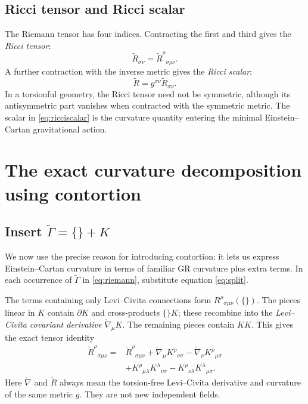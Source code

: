 \documentclass[11pt,a4paper]{article}
\newcommand{\LC}{\mathring{\nabla}}
\newcommand{\RR}{\mathring{R}}
\begin{document}
\subsection{Ricci tensor and Ricci scalar}
The Riemann tensor has four indices. Contracting the first and third gives the \emph{Ricci tensor}:
\begin{equation}\label{eq:ricci}
\boxed{\widetilde R_{\sigma\nu}=\widetilde R^\rho{}_{\sigma\rho\nu}.}
\end{equation}
A further contraction with the inverse metric gives the \emph{Ricci scalar}:
\begin{equation}\label{eq:ricciscalar}
\boxed{\widetilde R=g^{\sigma\nu}\widetilde R_{\sigma\nu}.}
\end{equation}
In a torsionful geometry, the Ricci tensor need not be symmetric, although its antisymmetric part vanishes when contracted with the symmetric metric. The scalar in \eqref{eq:ricciscalar} is the curvature quantity entering the minimal Einstein--Cartan gravitational action.

\section{The exact curvature decomposition using contortion}
\subsection{Insert $\widetilde\Gamma=\{\}+K$}
We now use the precise reason for introducing contortion: it lets us express Einstein--Cartan curvature in terms of familiar GR curvature plus extra terms. In each occurrence of $\widetilde\Gamma$ in \eqref{eq:riemann}, substitute equation \eqref{eq:split}.

The terms containing only Levi--Civita connections form $R^\rho{}_{\sigma\mu\nu}(\{\})$. The pieces linear in $K$ contain $\partial K$ and cross-products $\{\}K$; these recombine into the \emph{Levi--Civita covariant derivative} $\LC_\mu K$. The remaining pieces contain $KK$. This gives the exact tensor identity
\begin{equation}\label{eq:Rsplit}
\boxed{\begin{aligned}
\widetilde R^\rho{}_{\sigma\mu\nu}={}&\RR^\rho{}_{\sigma\mu\nu}
+\LC_\mu K^\rho{}_{\nu\sigma}-\LC_\nu K^\rho{}_{\mu\sigma}\\
&+K^\rho{}_{\mu\lambda}K^\lambda{}_{\nu\sigma}-K^\rho{}_{\nu\lambda}K^\lambda{}_{\mu\sigma}.
\end{aligned}}
\end{equation}
Here $\LC$ and $\RR$ always mean the torsion-free Levi--Civita derivative and curvature of the same metric $g$. They are not new independent fields.
\end{document}
